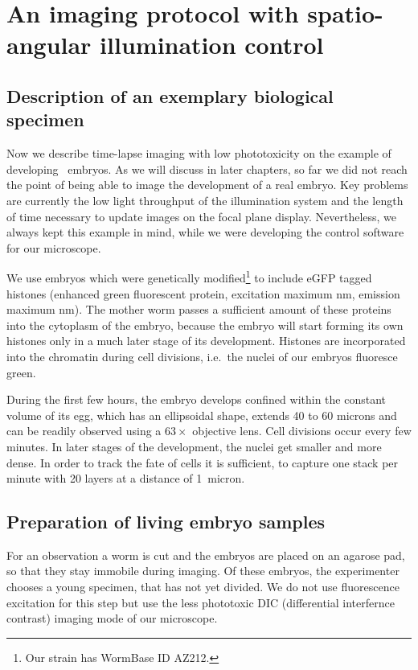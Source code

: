 \section{An imaging protocol with spatio-angular illumination control}
\subsection{Description of an exemplary biological specimen}
Now we describe time-lapse imaging with low phototoxicity on the
example of developing \celegans\ embryos. As we will discuss in later chapters, so far we did not reach
the point of being able to image the development of a real embryo. Key
problems are currently the low light throughput of the illumination
system and the length of time necessary to update images on the focal
plane display. Nevertheless, we always kept this example in mind,
while we were developing the control software for our microscope.

We use embryos which  were genetically modified\footnote{Our strain has WormBase ID AZ212.}
to include eGFP tagged histones (enhanced green fluorescent protein,
excitation maximum \unit[488]{nm}, emission maximum
\unit[509]{nm}). The mother worm passes a sufficient amount of these
proteins into the cytoplasm of the embryo, because the embryo
will start forming its own histones only in a much later stage of
its development. Histones are incorporated into the chromatin during cell
divisions, i.e.\ the nuclei of our embryos fluoresce green.

During the first few hours, the embryo develops confined within the
constant volume of its egg, which has an ellipsoidal shape,
extends 40 to 60 microns and can be readily observed using a
$63\times$ objective lens. Cell divisions occur every few minutes. In
later stages of the development, the nuclei get smaller and more
dense. In order to track the fate of cells it is sufficient, to
capture one stack per minute with 20 layers at a distance of 1~micron.
\subsection{Preparation of living embryo samples}
For an observation a worm is cut and the embryos are placed on an
agarose pad, so that they stay immobile during imaging. Of these
embryos, the experimenter chooses a young specimen, that has not yet
divided. We do not use fluorescence excitation for this step but use
the less phototoxic DIC (differential interfernce contrast) imaging
mode of our microscope.

